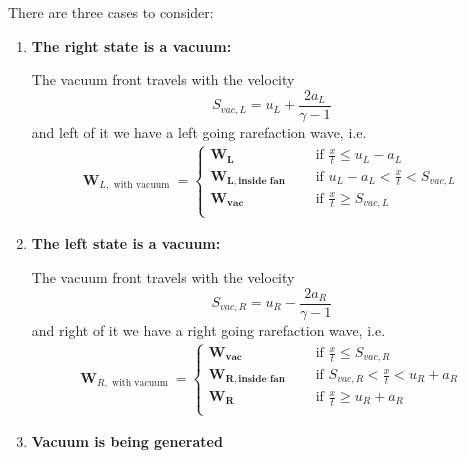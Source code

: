 There are three cases to consider:


\begin{enumerate}

	\item \textbf{The right state is a vacuum:}
	
		The vacuum front travels with the velocity
		\begin{equation}
			S_{vac, L} = u_L + \frac{2 a_L}{\gamma - 1}
		\end{equation}
		and left of it we have a left going rarefaction wave, i.e.
		\begin{align}
			\mathbf{W}_{L, \text{ with vacuum }} = 
				\begin{cases}
					\mathbf{W_L} & \quad \text{ if } \frac{x}{t} \leq u_L - a_L \\
					\mathbf{W_{L, \text{inside fan}}} & \quad \text{ if } u_L - a_L < \frac{x}{t} < S_{vac, L} \\
					\mathbf{W_{vac}} & \quad \text{ if } \frac{x}{t} \geq S_{vac, L}\\
				\end{cases}
		\end{align}
		
	\item \textbf{The left state is a vacuum:}
	
		The vacuum front travels with the velocity
		\begin{equation}
			S_{vac, R} = u_R - \frac{2 a_R}{\gamma - 1}
		\end{equation}
		and right of it we have a right going rarefaction wave, i.e.
		\begin{align}
			\mathbf{W}_{R, \text{ with vacuum }} = 
				\begin{cases}
					\mathbf{W_{vac}} & \quad \text{ if } \frac{x}{t} \leq S_{vac, R}\\
					\mathbf{W_{R, \text{inside fan}}} & \quad \text{ if } S_{vac, R} < \frac{x}{t} <   u_R + a_R\\
					\mathbf{W_R} & \quad \text{ if } \frac{x}{t} \geq u_R + a_R \\
				\end{cases}
		\end{align}
		
	\item \textbf{ Vacuum is being generated }
	

\end{enumerate}
